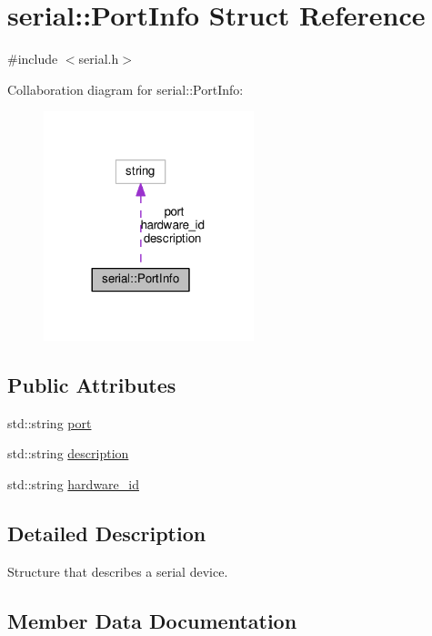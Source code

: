 \hypertarget{structserial_1_1_port_info}{}\section{serial\+:\+:Port\+Info Struct Reference}
\label{structserial_1_1_port_info}


{\ttfamily \#include $<$serial.\+h$>$}



Collaboration diagram for serial\+:\+:Port\+Info\+:\nopagebreak
\begin{figure}[H]
\begin{center}
\leavevmode
\includegraphics[width=173pt]{structserial_1_1_port_info__coll__graph}
\end{center}
\end{figure}
\subsection*{Public Attributes}
\begin{DoxyCompactItemize}
\item 
std\+::string \hyperlink{structserial_1_1_port_info_a5d4242cdd6c0d01260e24964af4c23d2}{port}
\item 
std\+::string \hyperlink{structserial_1_1_port_info_a2ba37dd33d47b554aef5c15c1fe8b872}{description}
\item 
std\+::string \hyperlink{structserial_1_1_port_info_a7d55368e1a4e6ccc9da6f4d339524837}{hardware\+\_\+id}
\end{DoxyCompactItemize}


\subsection{Detailed Description}
Structure that describes a serial device. 

\subsection{Member Data Documentation}
